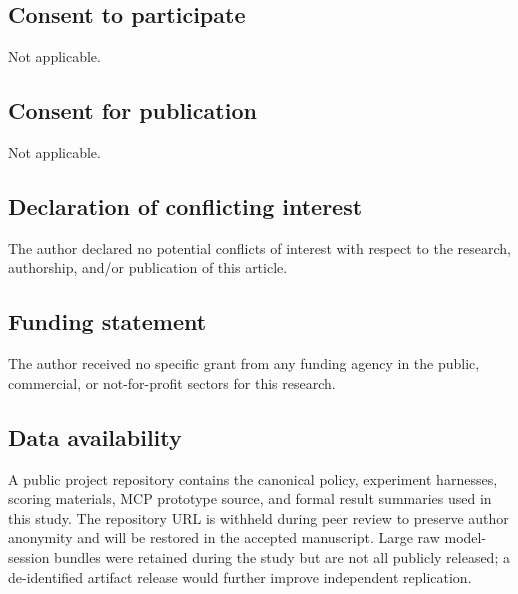 \documentclass[11pt]{article}
\begin{document}
\subsection*{Consent to participate}
Not applicable.

\subsection*{Consent for publication}
Not applicable.

\subsection*{Declaration of conflicting interest}
The author declared no potential conflicts of interest with respect to the research, authorship, and/or publication of this article.

\subsection*{Funding statement}
The author received no specific grant from any funding agency in the public, commercial, or not-for-profit sectors for this research.

\subsection*{Data availability}
A public project repository contains the canonical policy, experiment harnesses, scoring materials, MCP prototype source, and formal result summaries used in this study. The repository URL is withheld during peer review to preserve author anonymity and will be restored in the accepted manuscript. Large raw model-session bundles were retained during the study but are not all publicly released; a de-identified artifact release would further improve independent replication.
\end{document}
